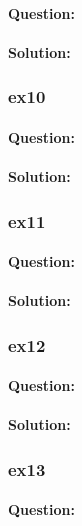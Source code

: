 \documentclass[a4paper,12pt,titlepage]{article} %
\begin{document}
\paragraph{Question:}

\paragraph{Solution:}

\subsubsection{ex10}
\paragraph{Question:}

\paragraph{Solution:}

\subsubsection{ex11}
\paragraph{Question:}

\paragraph{Solution:}

\subsubsection{ex12}
\paragraph{Question:}

\paragraph{Solution:}

\subsubsection{ex13}
\paragraph{Question:}
\end{document}
